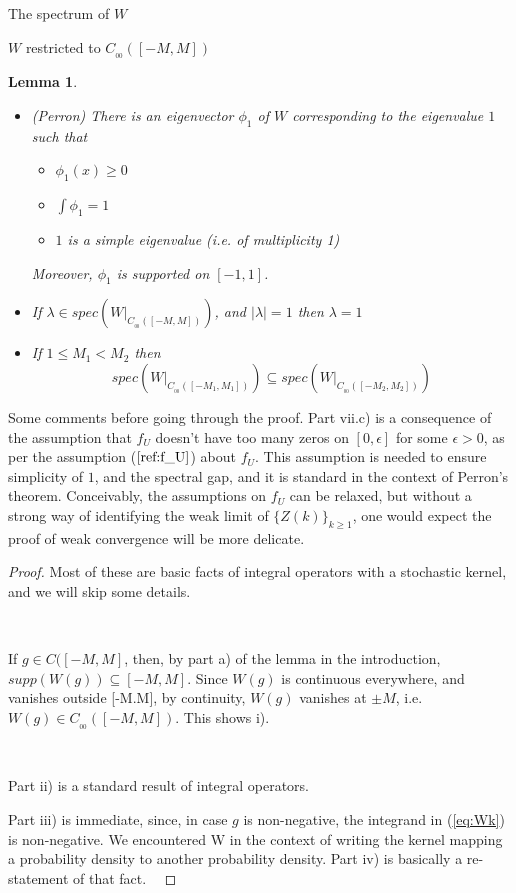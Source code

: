 \documentclass[12pt]{article}
\newtheorem*{lmm}{Lemma}
\newenvironment{remark}[1][Remark]{\begin{trivlist}
		\item[\hskip \labelsep {\bfseries #1}]}{\end{trivlist}}
\begin{document}
\begin{section}{The spectrum of $W$ }
\begin{subsection}{$W$ restricted to $C_{_{0\!0}}([-M,M])$}
\begin{lmm}
\begin{itemize}
			\item[vii.] (Perron) There is an eigenvector $\phi_1$ of $W$ corresponding to the eigenvalue $1$ such that 
				\begin{itemize}
					\item[a.] $\phi_1(x) \ge 0$
					\item[b.] $\int \phi_1 = 1$
					\item[c.] $1$ is a simple eigenvalue (i.e. of multiplicity 1)
				\end{itemize} 
			Moreover, $\phi_1$ is supported on $[-1,1]$.
			
			\item[viii.]  If $\lambda \in spec\left(W\Big|_{C_{_{0\!0}}([-M,M])}   \right)$, and $|\lambda|=1$ then $\lambda = 1$
			
			\item[ix.] If $1 \le M_1 < M_2$ then 
			$$
			spec(W\Big|_{C_{_{0\!0}}([-M_1,M_1])}) \subseteq 
			spec(W\Big|_{C_{_{0\!0}}([-M_2,M_2])})
			$$
		\end{itemize}	
	\end{lmm}	

\begin{remark} Some comments before going through the proof. Part vii.c) is a consequence of the assumption that $f_U$ doesn't have too many zeros on $[0,\epsilon]$ for some $\epsilon > 0$, as per the assumption ($\ref{ref:f_U}$) about $f_U$. This assumption is needed to ensure simplicity of $1$, and the spectral gap, and it is standard in the context of Perron's theorem. Conceivably, the assumptions on $f_U$ can be relaxed, but without a strong way of identifying the weak limit of $\{Z(k)\}_{k \ge 1}$, one would expect the proof of weak convergence will be more delicate.
\end{remark}

\begin{proof} 
	Most of these are basic facts of integral operators with a stochastic kernel, and we will skip some details.
	\  
	
	\    
	
	If $g \in C([-M,M]$, then, by part a) of the lemma in the introduction, $supp(W(g)) \subseteq [-M,M]$. Since $W(g)$ is continuous everywhere, and vanishes outside [-M.M], by continuity, $W(g)$ vanishes at $\pm M$, i.e. $W(g) \in C_{_{00}}([-M,M])$. This shows i).
	\  
	
	\   

	Part ii) is a standard result of integral operators. 
	
	Part iii) is immediate, since, in case $g$ is non-negative, the integrand in (\ref{eq:Wk}) is non-negative. 
	We encountered W in the context of writing the kernel mapping a probability density to another probability density. Part iv) is basically a re-statement of that fact. 
	\  
	

\end{proof}
\end{subsection}
\end{section}
\end{document}
